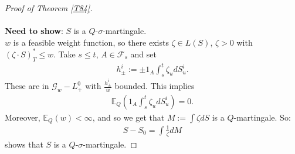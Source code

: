 \documentclass[12pt,a4paper, twoside]{article}
\theoremstyle{definition}
\newcommand{\EE}{\mathbb{E}} %
\begin{document}
\begin{proof}[Proof of Theorem \ref{T84}]
\\
\\
\textbf{Need to show}: $S$ is a $Q$-$\sigma$-martingale. \\
$w$ is a feasible weight function,  so there exists $\zeta \in L(S)$, $\zeta >0$ with $( \zeta \cdot S)_T^* \leq w$. Take $s \leq t$, $A \in \mathcal{F}_s$ and set \begin{align*}
h_\pm^i := \pm 1_A \int_s^t \zeta_u dS_u^i.
\end{align*}
These are in $\mathcal{G}_w-L_+^0$ with $\frac{h_\pm^i}{w}$ bounded. This implies 
\begin{align*}
\EE_Q \left( 1_A \int_s^t \zeta_u dS_u^i \right) =0.
\end{align*}
Moreover, $\EE_Q(w) < \infty$, and so we get that $M:= \int \zeta dS$ is a $Q$-martingale. So:
\begin{align*}
S-S_0 = \int \frac{1}{\zeta}dM
\end{align*}
shows that $S$ is a $Q$-$\sigma$-martingale. 
\end{proof}
\newpage
\end{document}
